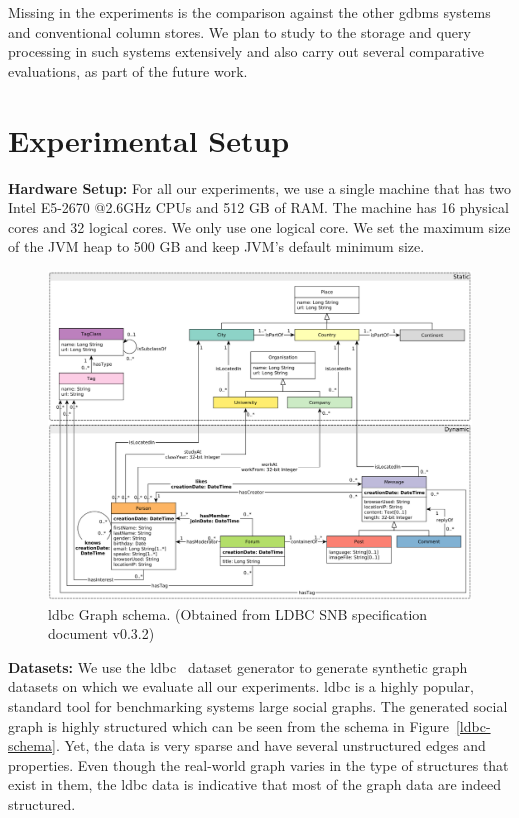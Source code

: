 Missing in the experiments is the comparison against the other \gls{gdbms} systems and conventional column stores. We plan to study to the storage and query processing in such systems extensively and also carry out several comparative evaluations, as part of the future work.

\section{Experimental Setup}

\noindent \textbf{Hardware Setup:} For all our experiments, we use a single machine that has two Intel E5-2670 @2.6GHz CPUs and 512 GB of RAM. The machine has 16 physical cores and 32 logical cores. We only use one logical core. We set the maximum size of the JVM heap to 500 GB and keep JVM’s default minimum size.

\begin{figure}
	\hspace{-25pt}
	\includegraphics[scale=0.45]{img/ldbc-schema}
	\begin{center}
		\captionsetup{justification=centering}
		\caption{\gls{ldbc} Graph schema. (Obtained from LDBC SNB specification document v0.3.2)}
	\end{center}
	\label{fig:ldbc-schema}
\end{figure}

\noindent \textbf{Datasets:} We use the \gls{ldbc}~\cite{ldbc} dataset generator to generate synthetic graph datasets on which we evaluate all our experiments. \gls{ldbc} is a highly popular, standard tool for benchmarking systems large social graphs. The generated social graph is highly structured which can be seen from the schema in Figure~\ref{ldbc-schema}. Yet, the data is very sparse and have several unstructured edges and properties. Even though the real-world graph varies in the type of structures that exist in them, the \gls{ldbc} data is indicative that most of the graph data are indeed structured.

